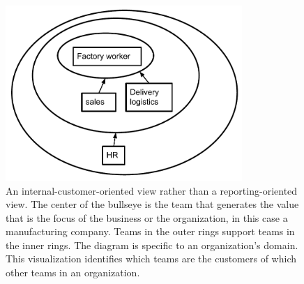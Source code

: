\begin{figure}
\begin{center}
\includegraphics[width=0.8\textwidth]{images/org_chart_wedding_cake_dependencies_-_manufacturing.pdf}
\end{center}
\caption{An internal-customer-oriented view rather than a reporting-oriented view. The center of the bullseye is the team that generates the value that is the focus of the business or the organization, in this case a manufacturing company.
Teams in the outer rings support teams in the inner rings. The diagram is specific to an organization's domain. This visualization identifies which teams are the customers of which other teams in an organization. }
\label{fig:org_chart_wedding_cake_manufacturing}
\end{figure}



